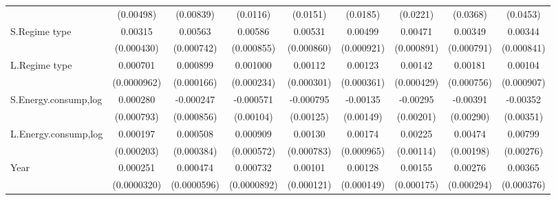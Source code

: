 \begin{table}[htbp]
\begin{tabular}{l*{8}{c}}
                    &   (0.00498)         &   (0.00839)         &    (0.0116)         &    (0.0151)         &    (0.0185)         &    (0.0221)         &    (0.0368)         &    (0.0453)         \\
[1em]
S.Regime type       &     0.00315\sym{***}&     0.00563\sym{***}&     0.00586\sym{***}&     0.00531\sym{***}&     0.00499\sym{***}&     0.00471\sym{***}&     0.00349\sym{***}&     0.00344\sym{***}\\
                    &  (0.000430)         &  (0.000742)         &  (0.000855)         &  (0.000860)         &  (0.000921)         &  (0.000891)         &  (0.000791)         &  (0.000841)         \\
[1em]
L.Regime type       &    0.000701\sym{***}&    0.000899\sym{***}&    0.001000\sym{***}&     0.00112\sym{***}&     0.00123\sym{***}&     0.00142\sym{***}&     0.00181\sym{**} &     0.00104         \\
                    & (0.0000962)         &  (0.000166)         &  (0.000234)         &  (0.000301)         &  (0.000361)         &  (0.000429)         &  (0.000756)         &  (0.000907)         \\
[1em]
S.Energy.consump,log&    0.000280         &   -0.000247         &   -0.000571         &   -0.000795         &    -0.00135         &    -0.00295         &    -0.00391         &    -0.00352         \\
                    &  (0.000793)         &  (0.000856)         &   (0.00104)         &   (0.00125)         &   (0.00149)         &   (0.00201)         &   (0.00290)         &   (0.00351)         \\
[1em]
L.Energy.consump,log&    0.000197         &    0.000508         &    0.000909         &     0.00130\sym{*}  &     0.00174\sym{*}  &     0.00225\sym{**} &     0.00474\sym{**} &     0.00799\sym{***}\\
                    &  (0.000203)         &  (0.000384)         &  (0.000572)         &  (0.000783)         &  (0.000965)         &   (0.00114)         &   (0.00198)         &   (0.00276)         \\
[1em]
Year                &    0.000251\sym{***}&    0.000474\sym{***}&    0.000732\sym{***}&     0.00101\sym{***}&     0.00128\sym{***}&     0.00155\sym{***}&     0.00276\sym{***}&     0.00365\sym{***}\\
                    & (0.0000320)         & (0.0000596)         & (0.0000892)         &  (0.000121)         &  (0.000149)         &  (0.000175)         &  (0.000294)         &  (0.000376)         \\

\end{tabular}
\end{table}
